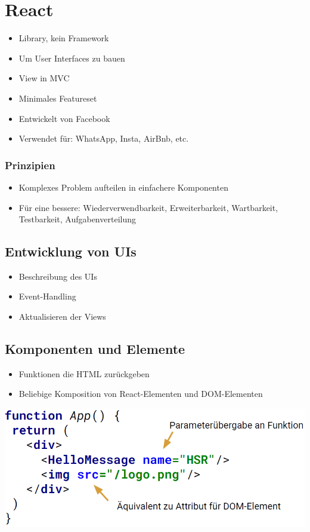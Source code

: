 
\section{React}
\begin{itemize}
    \item Library, kein Framework
    \item Um User Interfaces zu bauen
    \item View in MVC
    \item Minimales Featureset
    \item Entwickelt von Facebook
    \item Verwendet für: WhatsApp, Insta, AirBnb, etc.
\end{itemize}
\subsubsection{Prinzipien}
\begin{itemize}
    \item Komplexes Problem aufteilen in einfachere Komponenten
    \item Für eine bessere: Wiederverwendbarkeit, Erweiterbarkeit, Wartbarkeit, Testbarkeit, Aufgabenverteilung
\end{itemize}

\subsection{Entwicklung von UIs}
\begin{itemize}
    \item Beschreibung des UIs
    \item Event-Handling
    \item Aktualisieren der Views
\end{itemize}

\subsection{Komponenten und Elemente}
\begin{itemize}
    \item Funktionen die HTML zurückgeben
    \item Beliebige Komposition von React-Elementen und DOM-Elementen
\end{itemize}
\includegraphics[width=0.6\linewidth]{img/react_component.png}

